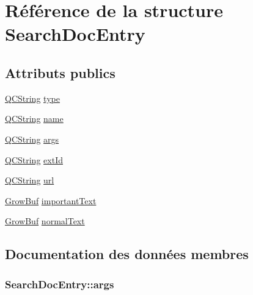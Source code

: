 \hypertarget{struct_search_doc_entry}{}\section{Référence de la structure Search\+Doc\+Entry}
\label{struct_search_doc_entry}
\subsection*{Attributs publics}
\begin{DoxyCompactItemize}
\item 
\hyperlink{class_q_c_string}{Q\+C\+String} \hyperlink{struct_search_doc_entry_a628b826e7aaa2e3d9fca5524fe6f7ce2}{type}
\item 
\hyperlink{class_q_c_string}{Q\+C\+String} \hyperlink{struct_search_doc_entry_a1fdc0594e9a3cde5c97802611d2dd6c0}{name}
\item 
\hyperlink{class_q_c_string}{Q\+C\+String} \hyperlink{struct_search_doc_entry_a037c1fb6101ce91538d56b0947d0835a}{args}
\item 
\hyperlink{class_q_c_string}{Q\+C\+String} \hyperlink{struct_search_doc_entry_af346c3d58867e1235d51656c9a9951d4}{ext\+Id}
\item 
\hyperlink{class_q_c_string}{Q\+C\+String} \hyperlink{struct_search_doc_entry_abe8caf3bff9736a11702102da14232aa}{url}
\item 
\hyperlink{class_grow_buf}{Grow\+Buf} \hyperlink{struct_search_doc_entry_a70ac96a54611c810bf88a36bb77898e2}{important\+Text}
\item 
\hyperlink{class_grow_buf}{Grow\+Buf} \hyperlink{struct_search_doc_entry_abab47279dc03fb989c8e32a08731b17b}{normal\+Text}
\end{DoxyCompactItemize}


\subsection{Documentation des données membres}
\hypertarget{struct_search_doc_entry_a037c1fb6101ce91538d56b0947d0835a}{}
\subsubsection[{args}]{ Search\+Doc\+Entry\+::args}\label{struct_search_doc_entry_a037c1fb6101ce91538d56b0947d0835a}
\hypertarget{struct_search_doc_entry_af346c3d58867e1235d51656c9a9951d4}{}
